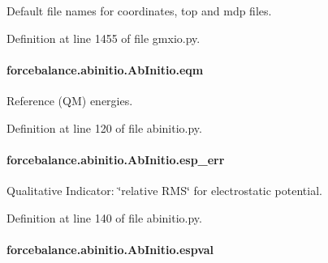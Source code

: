 Default file names for coordinates, top and mdp files. 



Definition at line 1455 of file gmxio.\-py.

\hypertarget{classforcebalance_1_1abinitio_1_1AbInitio_a64387fae9bdfb0d03ca6961e67c779be}{
\paragraph[{eqm}]{\setlength{\rightskip}{0pt plus 5cm}forcebalance.\-abinitio.\-Ab\-Initio.\-eqm\hspace{0.3cm}{\ttfamily [inherited]}}}\label{classforcebalance_1_1abinitio_1_1AbInitio_a64387fae9bdfb0d03ca6961e67c779be}


Reference (Q\-M) energies. 



Definition at line 120 of file abinitio.\-py.

\hypertarget{classforcebalance_1_1abinitio_1_1AbInitio_abdc625c3149cee375b56b4e0d73034fe}{
\paragraph[{esp\-\_\-err}]{\setlength{\rightskip}{0pt plus 5cm}forcebalance.\-abinitio.\-Ab\-Initio.\-esp\-\_\-err\hspace{0.3cm}{\ttfamily [inherited]}}}\label{classforcebalance_1_1abinitio_1_1AbInitio_abdc625c3149cee375b56b4e0d73034fe}


Qualitative Indicator\-: \char`\"{}relative R\-M\-S\char`\"{} for electrostatic potential. 



Definition at line 140 of file abinitio.\-py.

\hypertarget{classforcebalance_1_1abinitio_1_1AbInitio_aba6d885086d455fce8c3d472fd08020d}{
\paragraph[{espval}]{\setlength{\rightskip}{0pt plus 5cm}forcebalance.\-abinitio.\-Ab\-Initio.\-espval\hspace{0.3cm}{\ttfamily [inherited]}}}\label{classforcebalance_1_1abinitio_1_1AbInitio_aba6d885086d455fce8c3d472fd08020d}


